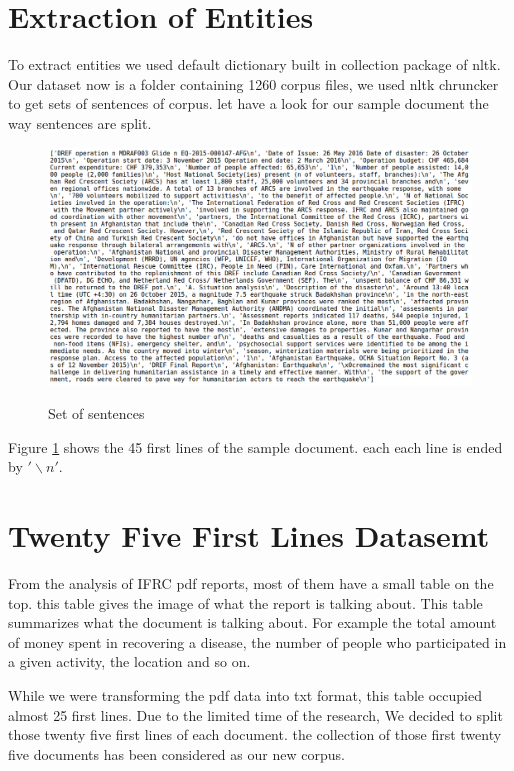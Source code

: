 \section{Extraction of Entities }

To extract entities we used default dictionary built in collection package of nltk. Our dataset now is a folder containing 1260 corpus files, we  used nltk chruncker to get sets of sentences of corpus. let have a look for our sample document the way sentences are split. 
\begin{figure}[hbtp]
\caption{Set of sentences}
\centering
\includegraphics[scale=0.4]{images/corpus.png}\label{Set of sentences}
\end{figure}


Figure \ref{Set of sentences} shows the 45 first lines of the sample document. each each line is ended by  $'\backslash n'$. 

\section{Twenty Five First Lines Datasemt}

From the analysis of IFRC pdf reports, most of them have a small table on the top. this table gives the image of what the report is talking about. This table summarizes what the document is talking about. For example the total amount of money spent in recovering a disease, the number of people who participated in a given activity, the location and so on.

While we were transforming the pdf data into txt format, this table occupied almost 25 first lines. Due to the limited time of the research, We decided to split those twenty five first lines of each document. the collection of those first twenty five documents has been considered as our new corpus.


